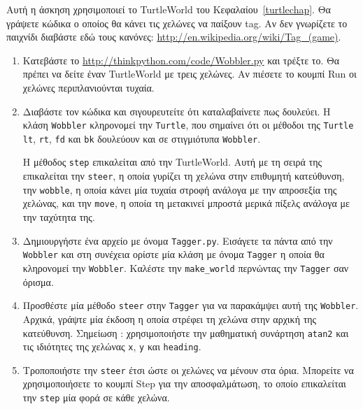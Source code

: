 \documentclass[10pt]{book}
\begin{document}
\begin{exercise}

Αυτή η άσκηση χρησιμοποιεί το TurtleWorld του Κεφαλαίου~\ref{turtlechap}.   
Θα γράψετε κώδικα ο οποίος θα κάνει τις χελώνες να παίξουν tag. Αν δεν γνωρίζετε το 
παιχνίδι διαβάστε εδώ τους κανόνες: \url{http://en.wikipedia.org/wiki/Tag_(game)}.  

\begin{enumerate}

\item Κατεβάστε το \url{http://thinkpython.com/code/Wobbler.py} και τρέξτε το.  
Θα πρέπει να δείτε έναν TurtleWorld με τρεις χελώνες.  Αν πιέσετε το κουμπί
{\sf Run} οι χελώνες περιπλανιούνται τυχαία.

\item Διαβάστε τον κώδικα και σιγουρευτείτε ότι καταλαβαίνετε πως δουλεύει.  
Η κλάση {\tt Wobbler} κληρονομεί την {\tt Turtle}, που σημαίνει ότι
οι μέθοδοι της {\tt Turtle} {\tt lt}, {\tt rt}, {\tt fd} και {\tt bk}  
δουλεύουν και σε στιγμιότυπα {\tt Wobbler}.  

Η μέθοδος {\tt step} επικαλείται από την TurtleWorld.  Αυτή με τη σειρά της επικαλείται
την {\tt steer}, η οποία γυρίζει τη χελώνα στην επιθυμητή κατεύθυνση, την {\tt wobble},
η οποία κάνει μία τυχαία στροφή ανάλογα με την απροσεξία της χελώνας, και την {\tt move},
η οποία τη μετακινεί μπροστά μερικά πίξελς ανάλογα με την ταχύτητα της.

\item Δημιουργήστε ένα αρχείο με όνομα {\tt Tagger.py}.  Εισάγετε τα πάντα
από την {\tt Wobbler} και στη συνέχεια ορίστε μία κλάση με όνομα {\tt Tagger} 
η οποία θα κληρονομεί την {\tt Wobbler}.  Καλέστε την \verb"make_world" 
περνώντας την {\tt Tagger} σαν όρισμα.

\item Προσθέστε μία μέθοδο  {\tt steer}  στην  {\tt Tagger}  για να παρακάμψει 
  αυτή της  {\tt Wobbler}.   Αρχικά, γράψτε μία έκδοση η οποία στρέφει τη χελώνα στην 
  αρχική της κατεύθυνση.  Σημείωση :  χρησιμοποιήστε την μαθηματική συνάρτηση  
  {\tt atan2}  και τις ιδιότητες της χελώνας  {\tt x}, {\tt y}  και  
  {\tt heading}. 

\item Τροποποιήστε την  {\tt steer}  έτσι ώστε οι χελώνες να μένουν στα όρια. 
  Μπορείτε να χρησιμοποιήσετε το κουμπί  {\sf Step}  για την αποσφαλμάτωση, το 
  οποίο επικαλείται την  {\tt step}  μία φορά σε κάθε χελώνα.


\end{enumerate}
\end{exercise}
\end{document}
